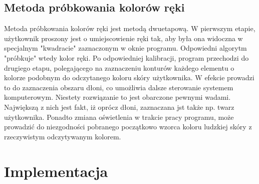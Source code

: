 \documentclass[a4paper,12pt]{article}
\begin{document}
\subsection{Metoda próbkowania kolorów ręki}
Metoda próbkowania kolorów ręki jest metodą dwuetapową. W pierwszym etapie, użytkownik proszony jest o umiejscowienie ręki tak, aby była ona widoczna w specjalnym "kwadracie" zaznaczonym w oknie programu. Odpowiedni algorytm "próbkuje" wtedy kolor ręki. Po odpowiedniej kalibracji, program przechodzi do drugiego etapu, polegającego na zaznaczeniu konturów każdego elementu o kolorze podobnym do odczytanego koloru skóry użytkownika. W efekcie prowadzi to do zaznaczenia obszaru dłoni, co umożliwia dalsze sterowanie systemem komputerowym. Niestety rozwiązanie to jest obarczone pewnymi wadami. Największą z nich jest fakt, iż oprócz dłoni, zaznaczana jst także np. twarz użytkownika. Ponadto zmiana oświetlenia w trakcie pracy programu, może prowadzić do niezgodności pobranego początkowo wzorca koloru ludzkiej skóry z rzeczywistym odczytywanym kolorem.


\section{Implementacja}
\end{document}
